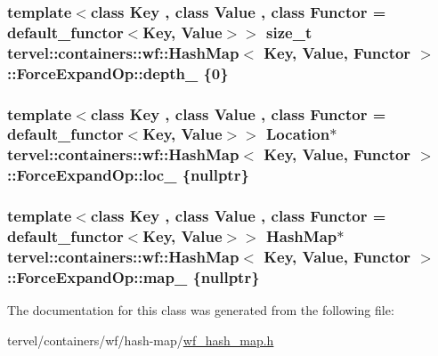 \subsubsection[{depth\+\_\+}]{\setlength{\rightskip}{0pt plus 5cm}template$<$class Key , class Value , class Functor  = default\+\_\+functor$<$\+Key, Value$>$$>$ size\+\_\+t {\bf tervel\+::containers\+::wf\+::\+Hash\+Map}$<$ Key, {\bf Value}, Functor $>$\+::Force\+Expand\+Op\+::depth\+\_\+ \{0\}\hspace{0.3cm}{\ttfamily [private]}}\label{classtervel_1_1containers_1_1wf_1_1_hash_map_1_1_force_expand_op_a089cd031b862f5bafb70882399148174}
\hypertarget{classtervel_1_1containers_1_1wf_1_1_hash_map_1_1_force_expand_op_a4f6bd52ceb03f190143e389f60714a53}{}
\subsubsection[{loc\+\_\+}]{\setlength{\rightskip}{0pt plus 5cm}template$<$class Key , class Value , class Functor  = default\+\_\+functor$<$\+Key, Value$>$$>$ {\bf Location}$\ast$ {\bf tervel\+::containers\+::wf\+::\+Hash\+Map}$<$ Key, {\bf Value}, Functor $>$\+::Force\+Expand\+Op\+::loc\+\_\+ \{nullptr\}\hspace{0.3cm}{\ttfamily [private]}}\label{classtervel_1_1containers_1_1wf_1_1_hash_map_1_1_force_expand_op_a4f6bd52ceb03f190143e389f60714a53}
\hypertarget{classtervel_1_1containers_1_1wf_1_1_hash_map_1_1_force_expand_op_a6d1c762e111e8324c9fcaf56354575e1}{}
\subsubsection[{map\+\_\+}]{\setlength{\rightskip}{0pt plus 5cm}template$<$class Key , class Value , class Functor  = default\+\_\+functor$<$\+Key, Value$>$$>$ {\bf Hash\+Map}$\ast$ {\bf tervel\+::containers\+::wf\+::\+Hash\+Map}$<$ Key, {\bf Value}, Functor $>$\+::Force\+Expand\+Op\+::map\+\_\+ \{nullptr\}\hspace{0.3cm}{\ttfamily [private]}}\label{classtervel_1_1containers_1_1wf_1_1_hash_map_1_1_force_expand_op_a6d1c762e111e8324c9fcaf56354575e1}


The documentation for this class was generated from the following file\+:\begin{DoxyCompactItemize}
\item 
tervel/containers/wf/hash-\/map/\hyperlink{wf__hash__map_8h}{wf\+\_\+hash\+\_\+map.\+h}\end{DoxyCompactItemize}

